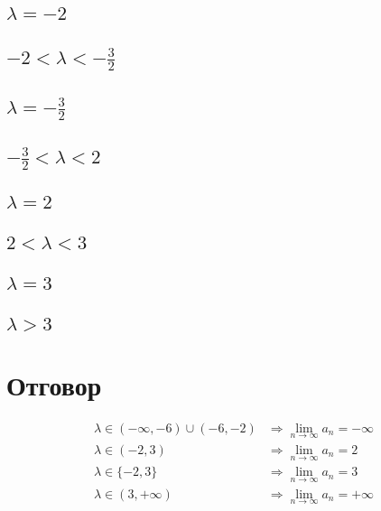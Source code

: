 \documentclass{article}
\begin{document}
\subsection{\( \lambda = -2 \)}


\subsection{\( -2 < \lambda < -\frac{3}{2} \)}


\subsection{\( \lambda = -\frac{3}{2} \)}


\subsection{\( -\frac{3}{2} < \lambda < 2 \)}


\subsection{\( \lambda = 2 \)}


\subsection{\( 2 < \lambda < 3 \)}


\subsection{\( \lambda = 3 \)}


\subsection{\( \lambda > 3 \)}


\section{Отговор}

\begin{align*}
\lambda \in (-\infty, -6) \cup (-6, -2) &\Longrightarrow \lim_{n \to \infty} a_n = -\infty \\
\lambda \in (-2, 3) &\Longrightarrow \lim_{n \to \infty} a_n = 2 \\
\lambda \in \{-2, 3\} &\Longrightarrow \lim_{n \to \infty} a_n = 3 \\
\lambda \in (3, +\infty) &\Longrightarrow \lim_{n \to \infty} a_n = +\infty \\
\end{align*}
\end{document}
